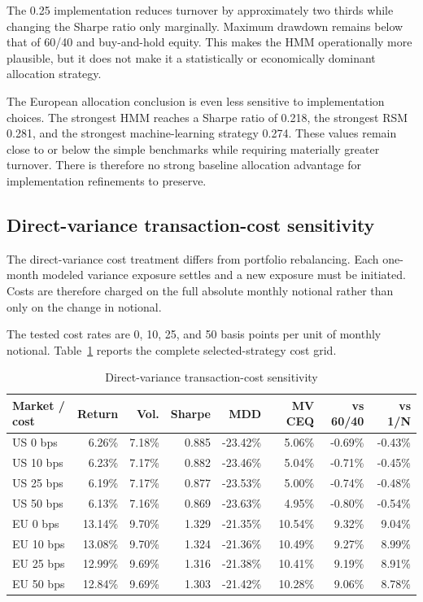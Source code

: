 The 0.25 implementation reduces turnover by approximately two thirds while changing the Sharpe ratio only marginally. Maximum drawdown remains below that of 60/40 and buy-and-hold equity. This makes the HMM operationally more plausible, but it does not make it a statistically or economically dominant allocation strategy.

The European allocation conclusion is even less sensitive to implementation choices. The strongest HMM reaches a Sharpe ratio of 0.218, the strongest RSM 0.281, and the strongest machine-learning strategy 0.274. These values remain close to or below the simple benchmarks while requiring materially greater turnover. There is therefore no strong baseline allocation advantage for implementation refinements to preserve.

\subsection{Direct-variance transaction-cost sensitivity}

The direct-variance cost treatment differs from portfolio rebalancing. Each one-month modeled variance exposure settles and a new exposure must be initiated. Costs are therefore charged on the full absolute monthly notional rather than only on the change in notional.

The tested cost rates are 0, 10, 25, and 50 basis points per unit of monthly notional. Table~\ref{tab:direct_costs} reports the complete selected-strategy cost grid.

\begin{table}[htbp]
\centering
\scriptsize
\caption{Direct-variance transaction-cost sensitivity}
\label{tab:direct_costs}
\begin{tabularx}{\textwidth}{Xrrrrrrr}
\toprule
Market / cost
& Return
& Vol.
& Sharpe
& MDD
& MV CEQ
& vs 60/40
& vs 1/N \\
\midrule
US 0 bps
& 6.26\%
& 7.18\%
& 0.885
& -23.42\%
& 5.06\%
& -0.69\%
& -0.43\% \\
US 10 bps
& 6.23\%
& 7.17\%
& 0.882
& -23.46\%
& 5.04\%
& -0.71\%
& -0.45\% \\
US 25 bps
& 6.19\%
& 7.17\%
& 0.877
& -23.53\%
& 5.00\%
& -0.74\%
& -0.48\% \\
US 50 bps
& 6.13\%
& 7.16\%
& 0.869
& -23.63\%
& 4.95\%
& -0.80\%
& -0.54\% \\
EU 0 bps
& 13.14\%
& 9.70\%
& 1.329
& -21.35\%
& 10.54\%
& 9.32\%
& 9.04\% \\
EU 10 bps
& 13.08\%
& 9.70\%
& 1.324
& -21.36\%
& 10.49\%
& 9.27\%
& 8.99\% \\
EU 25 bps
& 12.99\%
& 9.69\%
& 1.316
& -21.38\%
& 10.41\%
& 9.19\%
& 8.91\% \\
EU 50 bps
& 12.84\%
& 9.69\%
& 1.303
& -21.42\%
& 10.28\%
& 9.06\%
& 8.78\% \\
\bottomrule
\end{tabularx}
\end{table}


